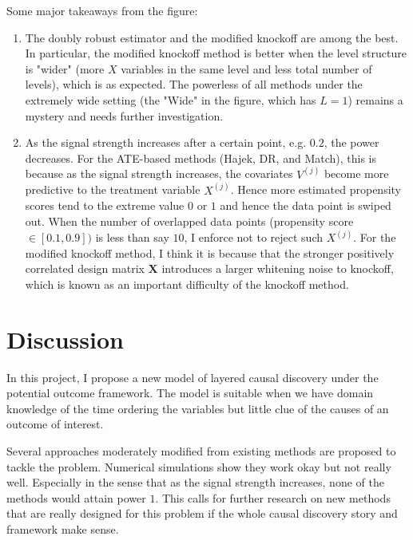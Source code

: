 \documentclass[11pt]{article}
\newcommand{\mat}[1]{\boldsymbol{#1}}
\begin{document}
Some major takeaways from the figure:
\begin{enumerate}
    \item The doubly robust estimator and the modified knockoff are among the best. In particular, the modified knockoff method is better when the level structure is "wider" (more $X$ variables in the same level and less total number of levels), which is as expected. The powerless of all methods under the extremely wide setting (the "Wide" in the figure, which has $L=1$) remains a mystery and needs further investigation.
    \item As the signal strength increases after a certain point, e.g. $0.2$, the power decreases.
        For the ATE-based methods (Hajek, DR, and Match), this is because as the signal strength increases, the covariates $V^{(j)}$ become more predictive to the treatment variable $X^{(j)}$. Hence more estimated propensity scores tend to the extreme value $0$ or $1$ and hence the data point is swiped out. When the number of overlapped data points (propensity score $\in [0.1, 0.9])$ is less than say $10$, I enforce not to reject such $X^{(j)}$.
        For the modified knockoff method, I think it is because that the stronger positively correlated design matrix $\mat X$ introduces a larger whitening noise to knockoff, which is known as an important difficulty of the knockoff method.
\end{enumerate}

\section{Discussion}

In this project, I propose a new model of layered causal discovery under the potential outcome framework. The model is suitable when we have domain knowledge of the time ordering the variables but little clue of the causes of an outcome of interest.

Several approaches moderately modified from existing methods are proposed to tackle the problem. Numerical simulations show they work okay but not really well. Especially in the sense that as the signal strength increases, none of the methods would attain power $1$. This calls for further research on new methods that are really designed for this problem if the whole causal discovery story and framework make sense.












\end{document}

